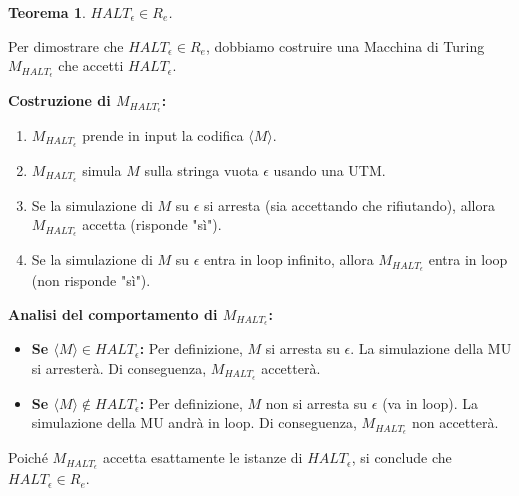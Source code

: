 \documentclass[a4paper]{article}
\makeatletter
\newtheorem{theorem}{Teorema}[section] %
\renewenvironment{proof}[1][\proofname]{\par
  \pushQED{\qed}%
  \normalfont \topsep6\p@\@plus6\p@\relax
  \trivlist
  \item[\hskip\labelsep
        \bfseries
    #1\@addpunct{.}]\ignorespaces
}{%
  \popQED\endtrivlist\@endpefalse
}
\makeatother
\begin{document}
\begin{theorem}
$HALT_\epsilon \in R_e$.
\end{theorem}
\begin{proof}
Per dimostrare che $HALT_\epsilon \in R_e$, dobbiamo costruire una Macchina di Turing $M_{HALT_\epsilon}$ che accetti $HALT_\epsilon$.

\textbf{Costruzione di $M_{HALT_\epsilon}$:}
\begin{enumerate}
    \item $M_{HALT_\epsilon}$ prende in input la codifica $\langle M \rangle$.
    \item $M_{HALT_\epsilon}$ simula $M$ sulla stringa vuota $\epsilon$ usando una UTM.
    \item Se la simulazione di $M$ su $\epsilon$ si arresta (sia accettando che rifiutando), allora $M_{HALT_\epsilon}$ accetta (risponde "sì").
    \item Se la simulazione di $M$ su $\epsilon$ entra in loop infinito, allora $M_{HALT_\epsilon}$ entra in loop (non risponde "sì").
\end{enumerate}
\textbf{Analisi del comportamento di $M_{HALT_\epsilon}$:}
\begin{itemize}
    \item \textbf{Se $\langle M \rangle \in HALT_\epsilon$:}
    Per definizione, $M$ si arresta su $\epsilon$. La simulazione della MU si arresterà. Di conseguenza, $M_{HALT_\epsilon}$ accetterà.
    \item \textbf{Se $\langle M \rangle \notin HALT_\epsilon$:}
    Per definizione, $M$ non si arresta su $\epsilon$ (va in loop). La simulazione della MU andrà in loop. Di conseguenza, $M_{HALT_\epsilon}$ non accetterà.
\end{itemize}
Poiché $M_{HALT_\epsilon}$ accetta esattamente le istanze di $HALT_\epsilon$, si conclude che $HALT_\epsilon \in R_e$.
\end{proof}
\end{document}
